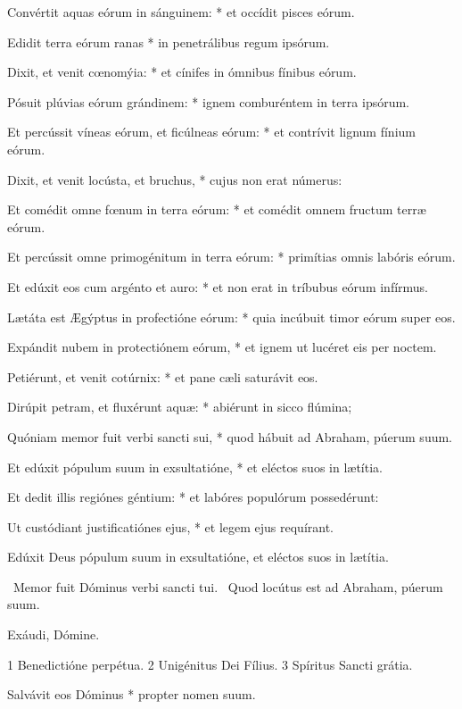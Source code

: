Convértit aquas eórum in sánguinem: * et occídit pisces eórum.

Edidit terra eórum ranas * in penetrálibus regum ipsórum.

Dixit, et venit cœnomýia: * et cínifes in ómnibus fínibus eórum.

Pósuit plúvias eórum grándinem: * ignem comburéntem in terra ipsórum.

Et percússit víneas eórum, et ficúlneas eórum: * et contrívit lignum fínium eórum.

Dixit, et venit locústa, et bruchus, * cujus non erat númerus:

Et comédit omne fœnum in terra eórum: * et comédit omnem fructum terræ eórum.

Et percússit omne primogénitum in terra eórum: * primítias omnis labóris eórum.

Et edúxit eos cum argénto et auro: * et non erat in tríbubus eórum infírmus.

Lætáta est Ægýptus in profectióne eórum: * quia incúbuit timor eórum super eos.

Expándit nubem in protectiónem eórum, * et ignem ut lucéret eis per noctem.

Petiérunt, et venit cotúrnix: * et pane cæli saturávit eos.

Dirúpit petram, et fluxérunt aquæ: * abiérunt in sicco flúmina;

Quóniam memor fuit verbi sancti sui, * quod hábuit ad Abraham, púerum suum.

Et edúxit pópulum suum in exsultatióne, * et eléctos suos in lætítia.

Et dedit illis regiónes géntium: * et labóres populórum possedérunt:

Ut custódiant justificatiónes ejus, * et legem ejus requírant.

 Edúxit Deus pópulum suum in exsultatióne, et eléctos suos in lætítia.


\V\ Memor fuit Dóminus verbi sancti tui. \R\ Quod locútus est ad Abraham, púerum suum.

 Exáudi, Dómine.

 1 Benedictióne perpétua. 2 Unigénitus Dei Fílius. 3 Spíritus Sancti grátia.


 Salvávit eos Dóminus * propter nomen suum.


